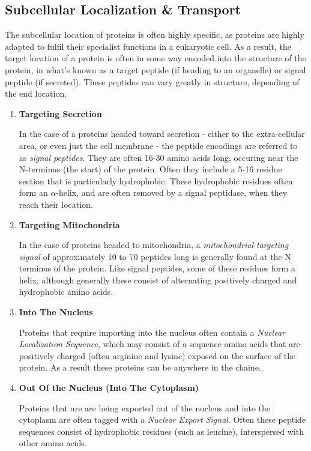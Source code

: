 \documentclass{bioinfo}
\begin{document}
\subsection{Subcellular Localization \& Transport}

The subcellular location of proteins is often highly specific, as proteins are highly adapted to fulfil their specialist functions in a eukaryotic cell. 
As a result, the target location of a protein is often in some way encoded into the structure of the protein, in what's known as a target peptide (if heading to an organelle) or signal peptide (if secreted). These peptides can vary greatly in structure, depending of the end location.

\begin{enumerate}
  \item {\textbf{Targeting Secretion}} 

  In the case of a proteins headed toward secretion - either to the extra-cellular area, or even just the cell membrane - the peptide encodings are referred to as \textit{signal peptides}. They are often 16-30 amino acids long, occuring near the N-terminus (the start) of the protein. Often they include a 5-16 residue section that is particularly hydrophobic. These hydrophobic residues often form an $\alpha$-helix, and are often removed by a signal peptidase, when they reach their location.

  \item {\textbf{Targeting Mitochondria}} 

  In the case of proteins headed to mitochondria, a \textit{mitochondrial targeting signal} of approximately 10 to 70 peptides long is generally found at the N terminus of the protein. Like signal peptides, some of these residues form a helix, although generally these consist of alternating positively charged and hydrophobic amino acids.

  \item {\textbf{Into The Nucleus}} 

  Proteins that require importing into the nucleus often contain a \textit{Nuclear Localization Sequence}, which may consist of a sequence amino acids that are positively charged (often arginine and lysine) exposed on the surface of the protein. As a result these proteins can be anywhere in the chaine.. 

   \item {\textbf{Out Of the Nucleus (Into The Cytoplasm)}} 

  Proteins that are are being exported out of the nucleus and into the cytoplasm are often tagged with a \textit{Nuclear Export Signal}. Often these peptide sequences consist of hydrophobic residues (such as leucine), interspersed with other amino acids.



\end{enumerate} 
\end{document}
